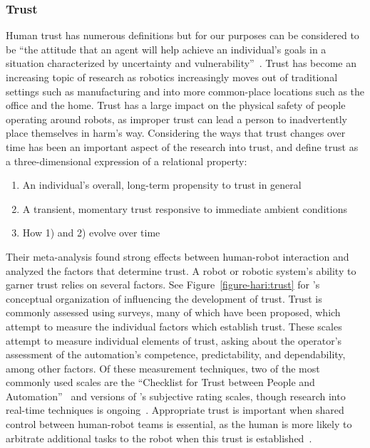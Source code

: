\subsubsection{Trust}
Human trust has numerous definitions but for our purposes can be considered to be ``the attitude that an agent will help achieve an individual's goals in a situation characterized by uncertainty and vulnerability''~\citep{lee_trust_2004}.
Trust has become an increasing topic of research as robotics increasingly moves out of traditional settings such as manufacturing and into more common-place locations such as the office and the home.
Trust has a large impact on the physical safety of people operating around robots, as improper trust can lead a person to inadvertently place themselves in harm's way.
Considering the ways that trust changes over time has been an important aspect of the research into trust, and \cite{schaefer_meta-analysis_2016} define trust as a three-dimensional expression of a relational property:
\begin{enumerate}
    \item An individual's overall, long-term propensity to trust in general
    \item A transient, momentary trust responsive to immediate ambient conditions
    \item How 1) and 2) evolve over time
\end{enumerate}
Their meta-analysis found strong effects between human-robot interaction and analyzed the factors that determine trust.
A robot or robotic system's ability to garner trust relies on several factors.
See Figure~\ref{figure-hari:trust} for \citeauthor{schaefer_meta-analysis_2016}'s conceptual organization of influencing the development of trust.
Trust is commonly assessed using surveys, many of which have been proposed, which attempt to measure the individual factors which establish trust.
These scales attempt to measure individual elements of trust, asking about the operator's assessment of the automation's competence, predictability, and dependability, among other factors.
Of these measurement techniques, two of the most commonly used scales are the ``Checklist for Trust between People and Automation''~\citep{jian_foundations_2000} and versions of \citeauthor{muir_trust_1996}'s subjective rating scales, though research into real-time techniques is ongoing~\citep{SEPPELT201966}.
Appropriate trust is important when shared control between human-robot teams is essential, as the human is more likely to arbitrate additional tasks to the robot when this trust is established~\citep{losey_review_2018}.

